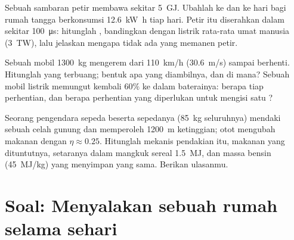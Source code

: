 \begin{exercise}[$\star\star\star$]\label{exo:g10:energy-conservation:13}
Sebuah sambaran petir membawa sekitar \qty{5}{GJ}. Ubahlah ke
 dan ke hari bagi rumah tangga berkonsumsi
\qty{12.6}{kW.h} tiap hari. Petir itu diserahkan dalam sekitar
\qty{100}{\micro s}: hitunglah , bandingkan dengan  listrik
rata-rata umat manusia (\qty{3}{TW}), lalu jelaskan mengapa tidak ada
yang memanen petir.
\end{exercise}

\begin{exercise}[$\star\star\star$]\label{exo:g10:energy-conservation:14}
Sebuah mobil \qty{1300}{kg} mengerem dari \qty{110}{km/h}
(\qty{30.6}{m/s}) sampai berhenti. Hitunglah  yang
terbuang; bentuk apa yang diambilnya, dan di mana? Sebuah mobil listrik
memungut kembali $60\%$ ke dalam baterainya: berapa  tiap
perhentian, dan berapa perhentian yang diperlukan untuk mengisi satu
?
\end{exercise}

\begin{exercise}[$\star\star\star$]\label{exo:g10:energy-conservation:15}
Seorang pengendara sepeda beserta sepedanya (\qty{85}{kg} seluruhnya)
mendaki sebuah celah gunung dan memperoleh \qty{1200}{m} ketinggian;
otot mengubah makanan dengan $\eta \approx 0.25$.
Hitunglah  mekanis pendakian itu,  makanan yang
dituntutnya, setaranya dalam mangkuk sereal \qty{1.5}{MJ}, dan massa
bensin (\qty{45}{MJ/kg}) yang menyimpan  yang sama. Berikan
ulasanmu.
\end{exercise}

\section{Soal: Menyalakan sebuah rumah selama sehari}

